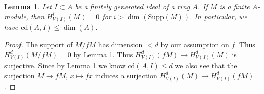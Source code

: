 \documentclass[10pt,a4paper]{amsart}
\theoremstyle{plain}
\newtheorem{lemma}[subsection]{Lemma}
\theoremstyle{definition}
\theoremstyle{remark}
\numberwithin{equation}{subsection}
\begin{document}
\begin{lemma}
\label{lemma-cd-dimension}
Let $I \subset A$ be a finitely generated ideal of a ring $A$.
If $M$ is a finite $A$-module, then
$H^i_{V(I)}(M) = 0$ for $i > \dim(\text{Supp}(M))$.
In particular, we have $\text{cd}(A, I) \leq \dim(A)$.
\end{lemma}

\begin{proof}
The support of $M/fM$ has dimension $< d$ by our assumption on $f$.
Thus $H^d_{V(I)}(M/fM) = 0$ by Lemma \ref{lemma-cd-dimension}.
Thus $H^d_{V(I)}(fM) \to H^d_{V(I)}(M)$ is surjective.
Since by Lemma \ref{lemma-cd-dimension} we know $\text{cd}(A, I) \leq d$
we also see that the surjection $M \to fM$, $x \mapsto fx$
induces a surjection $H^d_{V(I)}(M) \to H^d_{V(I)}(fM)$.
\end{proof}
\end{document}
